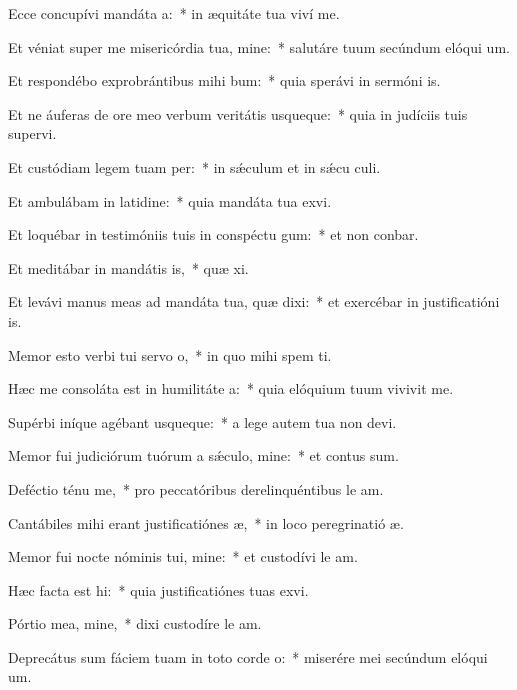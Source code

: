 \item Ecce concupívi mandáta a:~* in æquitáte tua viví me.
\item Et véniat super me misericórdia tua, mine:~* salutáre tuum secúndum elóqui um.
\item Et respondébo exprobrántibus mihi bum:~* quia sperávi in sermóni is.
\item Et ne áuferas de ore meo verbum veritátis usqueque:~* quia in judíciis tuis supervi.
\item Et custódiam legem tuam per:~* in sǽculum et in sǽcu culi.
\item Et ambulábam in latidine:~* quia mandáta tua exvi.
\item Et loquébar in testimóniis tuis in conspéctu gum:~* et non conbar.
\item Et meditábar in mandátis is,~* quæ xi.
\item Et levávi manus meas ad mandáta tua, quæ dixi:~* et exercébar in justificatióni is.
\item Memor esto verbi tui servo o,~* in quo mihi spem ti.
\item Hæc me consoláta est in humilitáte a:~* quia elóquium tuum vivivit me.
\item Supérbi iníque agébant usqueque:~* a lege autem tua non devi.
\item Memor fui judiciórum tuórum a sǽculo, mine:~* et contus sum.
\item Deféctio ténu me,~* pro peccatóribus derelinquéntibus le am.
\item Cantábiles mihi erant justificatiónes æ,~* in loco peregrinatió æ.
\item Memor fui nocte nóminis tui, mine:~* et custodívi le am.
\item Hæc facta est hi:~* quia justificatiónes tuas exvi.
\item Pórtio mea, mine,~* dixi custodíre le am.
\item Deprecátus sum fáciem tuam in toto corde o:~* miserére mei secúndum elóqui um.
